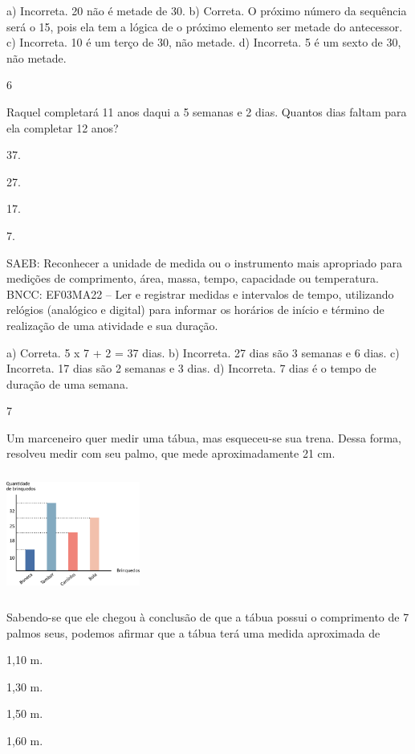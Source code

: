 \begin{multicols}{2}
{\begin{escolha}
{a) Incorreta. 20 não é metade de 30.
b) Correta. O próximo número da sequência será o 15, pois ela tem a lógica de o próximo
elemento ser metade do antecessor.
c) Incorreta. 10 é um terço de 30, não metade.
d) Incorreta. 5 é um sexto de 30, não metade.

\num{6}

Raquel completará 11 anos daqui a 5 semanas e 2 dias. Quantos dias faltam para ela completar 12 anos?

\begin{escolha}
\item
  37.
\item
  27.
\item
  17.
\item
  7.
\end{escolha}

SAEB: Reconhecer a unidade de medida ou o instrumento mais apropriado para medições de comprimento, área, massa, tempo, capacidade
ou temperatura.
BNCC: EF03MA22 -- Ler e registrar medidas e intervalos de tempo, utilizando relógios (analógico e
digital) para informar os horários de início e término de realização de uma atividade e sua
duração.

a) Correta. 5 x 7 + 2 = 37 dias.
b) Incorreta. 27 dias são 3 semanas e 6 dias.
c) Incorreta. 17 dias são 2 semanas e 3 dias.
d) Incorreta. 7 dias é o tempo de duração de uma semana.

\num{7}

Um marceneiro quer medir uma tábua, mas esqueceu-se sua trena. Dessa forma, resolveu medir com seu palmo, que mede aproximadamente 21 cm.


\includegraphics[width=1.73077in,height=1.57654in]{media/image119.png}

Sabendo-se que ele chegou à conclusão de que a tábua possui o comprimento de 7 palmos seus, podemos afirmar que a tábua terá uma medida aproximada de

\begin{escolha}
\item
  1,10 m.
\item
  1,30 m.
\item
  1,50 m.
\item
  1,60 m.
\end{escolha}

}
\end{escolha}}
\end{multicols}
